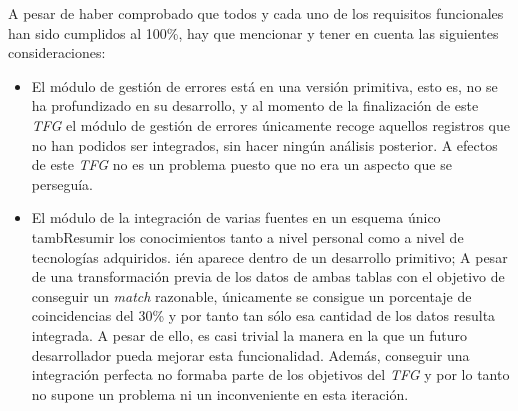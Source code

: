  A pesar de haber comprobado que todos y cada uno de los requisitos funcionales han sido cumplidos al 100\%, hay que mencionar y tener en cuenta las siguientes consideraciones:
\begin{itemize}
\item El módulo de gestión de errores está en una versión primitiva, esto es, no se ha profundizado en su desarrollo, y al momento de la finalización de este \textit{TFG} el módulo de gestión de errores únicamente recoge aquellos registros que no han podidos ser integrados, sin hacer ningún análisis posterior. A efectos de este \textit{TFG} no es un problema puesto que no era un aspecto que se perseguía. 
\item El módulo de la integración de varias fuentes en un esquema único tambResumir los conocimientos tanto a nivel personal como a nivel de tecnologías adquiridos.
ién aparece dentro de un desarrollo primitivo; A pesar de una transformación previa de los datos de ambas tablas con el objetivo de conseguir un \textit{match} razonable, únicamente se consigue un porcentaje de coincidencias del 30\% y por tanto tan sólo esa cantidad de los datos resulta integrada. A pesar de ello, es casi trivial la manera en la que un futuro desarrollador pueda mejorar esta funcionalidad. Además, conseguir una integración perfecta no formaba parte de los objetivos del \textit{TFG} y por lo tanto no supone un problema ni un inconveniente en esta iteración.
\end{itemize}

